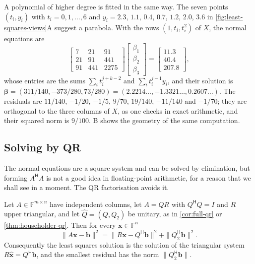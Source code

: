 A polynomial of higher degree is fitted in the same way. The seven points $(t_i,y_i)$ with $t_i=0,1,\ldots,6$ and $y_i=2.3$, $1.1$, $0.4$, $0.7$, $1.2$, $2.0$, $3.6$ in \cref{fig:least-squares-views}A suggest a parabola. With the rows $(1,t_i,t_i^2)$ of $X$, the normal equations are
\[
\begin{bmatrix}7&21&91\\21&91&441\\91&441&2275\end{bmatrix}\begin{bmatrix}\beta_1\\\beta_2\\\beta_3\end{bmatrix}=\begin{bmatrix}11.3\\40.4\\207.8\end{bmatrix},
\]
whose entries are the sums $\sum_it_i^{j+k-2}$ and $\sum_it_i^{j-1}y_i$, and their solution is $\boldsymbol\beta=(311/140,-373/280,73/280)=(2.2214\ldots,-1.3321\ldots,0.2607\ldots)$. The residuals are $11/140$, $-1/20$, $-1/5$, $9/70$, $19/140$, $-11/140$ and $-1/70$; they are orthogonal to the three columns of $X$, as one checks in exact arithmetic, and their squared norm is $9/100$. B shows the geometry of the same computation.

\subsection{Solving by QR}

The normal equations are a square system and can be solved by elimination, but forming $A^{\mathsf H}A$ is not a good idea in floating-point arithmetic, for a reason that we shall see in a moment. The QR factorisation avoids it.

\begin{theorem}
\label{thm:least-squares-qr}
Let $A\in\mathbb F^{m\times n}$ have independent columns, let $A=QR$ with $Q^{\mathsf H}Q=I$ and $R$ upper triangular, and let $\hat Q=(Q,Q_2)$ be unitary, as in \cref{cor:full-qr} or \cref{thm:householder-qr}. Then for every $\mathbf x\in\mathbb F^n$
\[
\|A\mathbf x-\mathbf b\|^2=\|R\mathbf x-Q^{\mathsf H}\mathbf b\|^2+\|Q_2^{\mathsf H}\mathbf b\|^2 .
\]
Consequently the least squares solution is the solution of the triangular system $R\hat{\mathbf x}=Q^{\mathsf H}\mathbf b$, and the smallest residual has the norm $\|Q_2^{\mathsf H}\mathbf b\|$.
\end{theorem}

